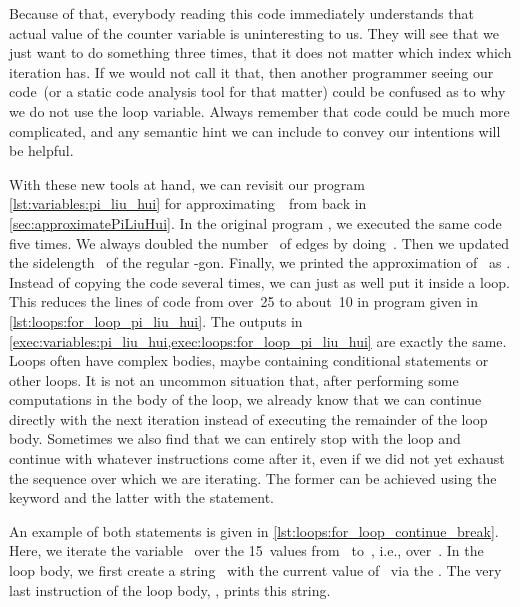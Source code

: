 Because of that, everybody reading this code immediately understands that actual value of the counter variable is uninteresting to us.
They will see that we just want to do something three times, that it does not matter which index which iteration has.
If we would not call it that, then another programmer seeing our code~(or a static code analysis tool for that matter) could be confused as to why we do not use the loop variable.
Always remember that  code could be much more complicated, and any semantic hint we can include to convey our intentions will be helpful.

With these new tools at hand, we can revisit our program \cref{lst:variables:pi_liu_hui} for approximating~\numberPi\ from back in \cref{sec:approximatePiLiuHui}.
In the original program , we executed the same code five times.
We always doubled the number~ of edges by doing~.
Then we updated the sidelength~ of the regular \nobreakdashes-gon.
Finally, we printed the approximation of \numberPi\ as .
Instead of copying the code several times, we can just as well put it inside a loop.
This reduces the lines of code from over~25 to about~10 in program  given in \cref{lst:loops:for_loop_pi_liu_hui}.
The outputs in \cref{exec:variables:pi_liu_hui,exec:loops:for_loop_pi_liu_hui} are exactly the same.%
%
\FloatBarrier%
\endhsection%
%
%
%
%
%
%
Loops often have complex bodies, maybe containing conditional statements or other loops.
It is not an uncommon situation that, after performing some computations in the body of the loop, we already know that we can continue directly with the next iteration instead of executing the remainder of the loop body.
Sometimes we also find that we can entirely stop with the loop and continue with whatever instructions come after it, even if we did not yet exhaust the sequence over which we are iterating.
The former can be achieved using the keyword  and the latter with the  statement.

An example of both statements is given in \cref{lst:loops:for_loop_continue_break}.
Here, we iterate the variable~ over the 15~values from~ to~, i.e., over~.
In the loop body, we first create a string~ with the current value of~ via the  .
The very last instruction of the loop body, , prints this string.

